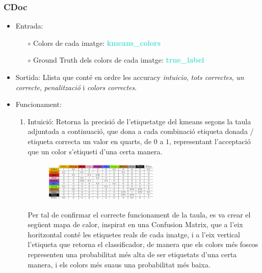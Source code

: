 \documentclass[a4paper, 11pt]{article}
\begin{document}
\subsubsection{CDoc}
\begin{itemize}
    \item Entrada: 
    \begin{itemize}
        \item[$\circ$] Colors de cada imatge: \textbf{\textcolor{Turquoise}{kmeans\_colors}}
        \item[$\circ$] Ground Truth dels colors de cada imatge: \textbf{\textcolor{Turquoise}{true\_label}}
    \end{itemize}
    \item Sortida: Llista que conté en ordre les accuracy \textit{intuicio}, \textit{tots correctes}, \textit{un correcte}, \textit{penalització} i \textit{colors correctes}.
    \item Funcionament: 
    \begin{enumerate}
        \item Intuició: Retorna la precisió de l'etiquetatge del kmeans segons la taula adjuntada a continuació, que dona a cada combinació etiqueta donada / etiqueta correcta un valor en quarts, de $0$ a $1$, representant l'acceptació que un color s'etiqueti d'una certa manera.
        
        \begin{figure}[h]
         \centering
            \includegraphics[width=0.55\textwidth]{matriu_colors.PNG}
        \end{figure}

        Per tal de confirmar el correcte funcionament de la taula, es va crear el següent mapa de calor, inspirat en una Confusion Matrix, que a l'eix horitzontal conté les etiquetes reals de cada imatge, i a l'eix vertical l'etiqueta que retorna el classificador, de manera que els colors més foscos representen una probabilitat més alta de ser etiquetats d'una certa manera, i els colors més suaus una probabilitat més baixa. 
        

\end{enumerate}
\end{itemize}
\end{document}
